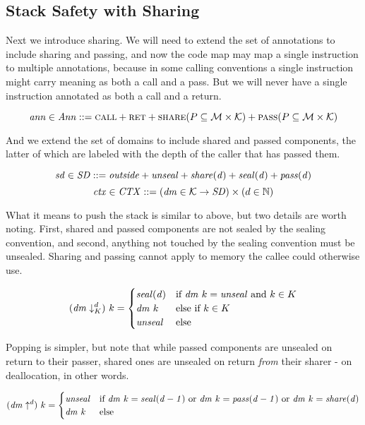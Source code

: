 \documentclass[acmsmall,review,anonymous]{acmart}\settopmatter{printfolios=true,printccs=false,printacmref=false}
\begin{document}
\subsection{Stack Safety with Sharing}

Next we introduce sharing. We will need to extend the set of annotations to include
sharing and passing, and now the code map may map a single instruction to multiple
annotations, because in some calling conventions a single instruction might carry
meaning as both a call and a pass. But we will never have a single instruction annotated
as both a call and a return.

\[\mathit{ann} \in \mathit{Ann} ::= \text{\sc call} + \text{\sc ret} + \text{\sc share}(P \subseteq {\mathcal M} \times {\mathcal K}) +
\text{\sc pass}(P \subseteq {\mathcal M} \times {\mathcal K})\]

And we extend the set of domains to include shared and passed components, the latter of
which are labeled with the depth of the caller that has passed them.

\[\mathit{sd} \in \mathit{SD} ::= \mathit{outside} + \mathit{unseal} + \mathit{share(d)} + \mathit{seal(d)} + \mathit{pass(d)}\]
\[\mathit{ctx} \in \mathit{CTX} ::= (\mathit{dm} \in {\mathcal K} \rightarrow \mathit{SD})
\times (d \in \mathbb{N}) \]

What it means to push the stack is similar to above, but two details are worth noting.
First, shared and passed components are not sealed by the sealing convention, and second,
anything not touched by the sealing convention must be unsealed. Sharing and passing cannot
apply to memory the callee could otherwise use.

\[
(\mathit{dm} \downarrow^{d}_{K}) ~ k =
\begin{cases}
  \mathit{seal(d)} & \text{if } \mathit{dm} ~ k = \mathit{unseal}
                    \text{ and } k \in K \\
  \mathit{dm} ~ k & \text{else if } k \in K \\
  \mathit{unseal} & \text{else} \\
\end{cases}
\]

Popping is simpler, but note that while passed components are unsealed on return to their
passer, shared ones are unsealed on return {\em from} their sharer - on deallocation,
in other words.

\[
(\mathit{dm} \uparrow^{d}) ~ k =
\begin{cases}
  \mathit{unseal} & \text{if } \mathit{dm} ~ k = \mathit{seal(d-1)}
              \text{ or } \mathit{dm} ~ k = \mathit{pass(d-1)}
              \text{ or } \mathit{dm} ~ k = \mathit{share(d)} \\
  \mathit{dm} ~ k & \text{else} \\
\end{cases}
\]
\end{document}
